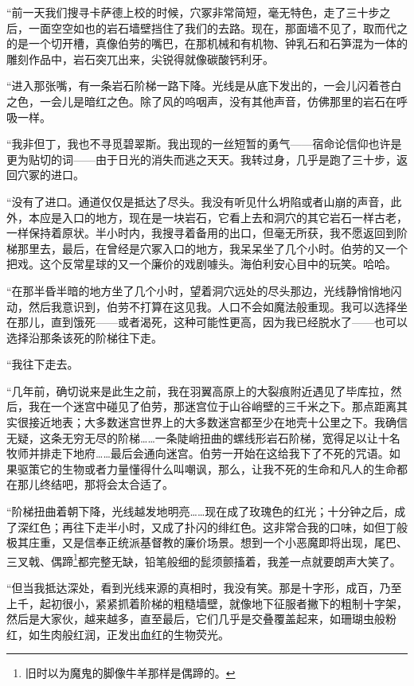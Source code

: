 \documentclass[AutoFakeBold=true]{book}
\begin{document}
``前一天我们搜寻卡萨德上校的时候，穴冢非常简短，毫无特色，走了三十步之后，一面空空如也的岩石墙壁挡住了我们的去路。现在，那面墙不见了，取而代之的是一个切开槽，真像伯劳的嘴巴，在那机械和有机物、钟乳石和石笋混为一体的雕刻作品中，岩石突兀出来，尖锐得就像碳酸钙利牙。

``进入那张嘴，有一条岩石阶梯一路下降。光线是从底下发出的，一会儿闪着苍白之色，一会儿是暗红之色。除了风的呜咽声，没有其他声音，仿佛那里的岩石在呼吸一样。

``我非但丁，我也不寻觅碧翠斯。我出现的一丝短暂的勇气——宿命论信仰也许是更为贴切的词——由于日光的消失而逃之天天。我转过身，几乎是跑了三十步，返回穴冢的进口。

``没有了进口。通道仅仅是抵达了尽头。我没有听见什么坍陷或者山崩的声音，此外，本应是入口的地方，现在是一块岩石，它看上去和洞穴的其它岩石一样古老，一样保持着原状。半小时内，我搜寻着备用的出口，但毫无所获，我不愿返回到阶梯那里去，最后，在曾经是穴冢入口的地方，我呆呆坐了几个小时。伯劳的又一个把戏。这个反常星球的又一个廉价的戏剧噱头。海伯利安心目中的玩笑。哈哈。

``在那半昏半暗的地方坐了几个小时，望着洞穴远处的尽头那边，光线静悄悄地闪动，然后我意识到，伯劳不打算在这见我。人口不会如魔法般重现。我可以选择坐在那儿，直到饿死——或者渴死，这种可能性更高，因为我已经脱水了——也可以选择沿那条该死的阶梯往下走。

``我往下走去。

``几年前，确切说来是此生之前，我在羽翼高原上的大裂痕附近遇见了毕库拉，然后，我在一个迷宫中碰见了伯劳，那迷宫位于山谷峭壁的三千米之下。那点距离其实很接近地表；大多数迷宫世界上的大多数迷宫都至少在地壳十公里之下。我确信无疑，这条无穷无尽的阶梯……一条陡峭扭曲的螺线形岩石阶梯，宽得足以让十名牧师并排走下地府……最后会通向迷宫。伯劳一开始在这给我下了不死的咒语。如果驱策它的生物或者力量懂得什么叫嘲讽，那么，让我不死的生命和凡人的生命都在那儿终结吧，那将会太合适了。

``阶梯扭曲着朝下降，光线越发地明亮……现在成了玫瑰色的红光；十分钟之后，成了深红色；再往下走半小时，又成了扑闪的绯红色。这非常合我的口味，如但丁般极其庄重，又是信奉正统派基督教的廉价场景。想到一个小恶魔即将出现，尾巴、三叉戟、偶蹄\footnote{旧时以为魔鬼的脚像牛羊那样是偶蹄的。}都完整无缺，铅笔般细的髭须颤搐着，我差一点就要朗声大笑了。

``但当我抵达深处，看到光线来源的真相时，我没有笑。那是十字形，成百，乃至上千，起初很小，紧紧抓着阶梯的粗糙墙壁，就像地下征服者撇下的粗制十字架，然后是大家伙，越来越多，直至最后，它们几乎是交叠覆盖起来，如珊瑚虫般粉红，如生肉般红润，正发出血红的生物荧光。
\end{document}

